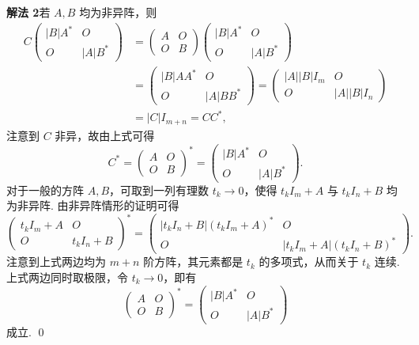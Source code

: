 \documentclass[UTF8, 12pt, fontset=fandol, oneside]{ctexart}
\begin{document}
\noindent\textbf{解法 2}\quad 若 $A,B$ 均为非异阵，则
\[
\begin{aligned}
C
\left(
\begin{array}{cc}
|B|A^* & O\\
O & |A|B^*
\end{array}
\right)
&=
\left(
\begin{array}{cc}
A & O\\
O & B
\end{array}
\right)
\left(
\begin{array}{cc}
|B|A^* & O\\
O & |A|B^*
\end{array}
\right)\\
&=
\left(
\begin{array}{cc}
|B|AA^* & O\\
O & |A|BB^*
\end{array}
\right)
=
\left(
\begin{array}{cc}
|A||B|I_m & O\\
O & |A||B|I_n
\end{array}
\right)\\
&=|C|I_{m+n}=CC^*,
\end{aligned}
\]
注意到 $C$ 非异，故由上式可得
\[
C^*=
\left(
\begin{array}{cc}
A & O\\
O & B
\end{array}
\right)^*
=
\left(
\begin{array}{cc}
|B|A^* & O\\
O & |A|B^*
\end{array}
\right).
\]
对于一般的方阵 $A,B$，可取到一列有理数 $t_k\to0$，使得 $t_kI_m+A$ 与 $t_kI_n+B$ 均为非异阵. 由非异阵情形的证明可得
\[
\left(
\begin{array}{cc}
t_kI_m+A & O\\
O & t_kI_n+B
\end{array}
\right)^*
=
\left(
\begin{array}{cc}
|t_kI_n+B|(t_kI_m+A)^* & O\\
O & |t_kI_m+A|(t_kI_n+B)^*
\end{array}
\right).
\]
注意到上式两边均为 $m+n$ 阶方阵，其元素都是 $t_k$ 的多项式，从而关于 $t_k$ 连续. 上式两边同时取极限，令 $t_k\to0$，即有
\[
\left(
\begin{array}{cc}
A & O\\
O & B
\end{array}
\right)^*
=
\left(
\begin{array}{cc}
|B|A^* & O\\
O & |A|B^*
\end{array}
\right)
\]
成立. \qed
\end{document}
